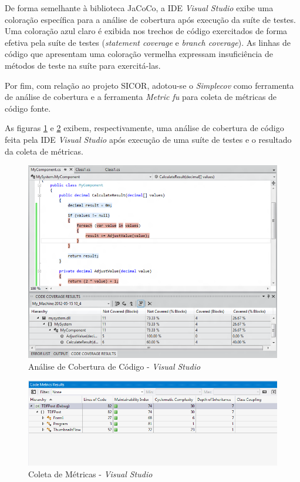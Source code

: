 De forma semelhante à biblioteca JaCoCo, a IDE \textit{Visual Studio} exibe uma coloração específica para a análise de cobertura após execução da suíte de testes. Uma coloração azul claro é exibida nos trechos de código exercitados de forma efetiva pela suíte de testes (\textit{statement coverage} e \textit{branch coverage}). As linhas de código que apresentam uma coloração vermelha expressam insuficiência de métodos de teste na suíte para exercitá-las.

Por fim, com relação ao projeto SICOR, adotou-se o \textit{Simplecov} como ferramenta de análise de cobertura e a ferramenta \textit{Metric fu} para coleta de métricas de código fonte.

As figuras \ref{fig:coberturaVS} e \ref{fig:metricasVS} exibem, respectivamente, uma análise de cobertura de código feita pela IDE \textit{Visual Studio} após execução de uma suíte de testes e o resultado da coleta de métricas.

\begin{figure}[h]
\includegraphics[width=\textwidth]{figuras/codeCoverageVS.png}
\caption{Análise de Cobertura de Código - \textit{Visual Studio}}
\label{fig:coberturaVS}
\end{figure}

\begin{figure}[h]
\includegraphics[width=\textwidth]{figuras/metricsVS.png}
\caption{Coleta de Métricas - \textit{Visual Studio}}
\label{fig:metricasVS}
\end{figure}

